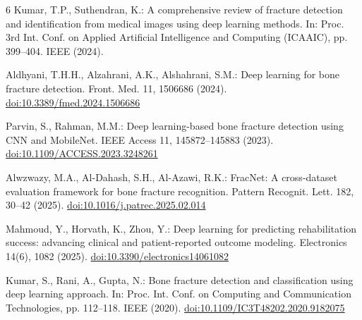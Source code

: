 \documentclass{styles/svproc}
\begin{document}
\begin{thebibliography}{6}
 Kumar, T.P., Suthendran, K.: A comprehensive review of fracture detection and identification from medical images using deep learning methods. In: Proc. 3rd Int. Conf. on Applied Artificial Intelligence and Computing (ICAAIC), pp. 399--404. IEEE (2024).

 Aldhyani, T.H.H., Alzahrani, A.K., Alshahrani, S.M.: Deep learning for bone fracture detection. Front. Med. 11, 1506686 (2024). \url{doi:10.3389/fmed.2024.1506686}

 Parvin, S., Rahman, M.M.: Deep learning-based bone fracture detection using CNN and MobileNet. IEEE Access 11, 145872--145883 (2023). \url{doi:10.1109/ACCESS.2023.3248261}

 Alwzwazy, M.A., Al-Dahash, S.H., Al-Azawi, R.K.: FracNet: A cross-dataset evaluation framework for bone fracture recognition. Pattern Recognit. Lett. 182, 30--42 (2025). \url{doi:10.1016/j.patrec.2025.02.014}

 Mahmoud, Y., Horvath, K., Zhou, Y.: Deep learning for predicting rehabilitation success: advancing clinical and patient-reported outcome modeling. Electronics 14(6), 1082 (2025). \url{doi:10.3390/electronics14061082}

 Kumar, S., Rani, A., Gupta, N.: Bone fracture detection and classification using deep learning approach. In: Proc. Int. Conf. on Computing and Communication Technologies, pp. 112--118. IEEE (2020). \url{doi:10.1109/IC3T48202.2020.9182075}

\end{thebibliography}
\end{document}
